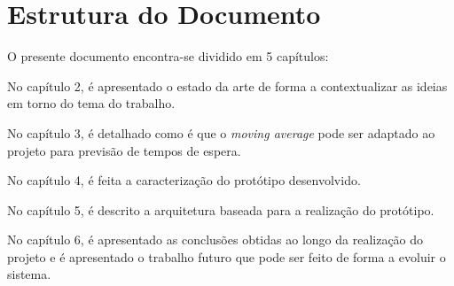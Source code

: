 \section{Estrutura do Documento} 
\label{sec:introduction}
O presente documento encontra-se dividido em 5 capítulos:

No capítulo 2, é apresentado o estado da arte de forma a contextualizar as ideias em torno do tema do trabalho.

No capítulo 3, é detalhado como é que o \textit{moving average} pode ser adaptado ao projeto para previsão de tempos de espera.

No capítulo 4, é feita a caracterização do protótipo desenvolvido.

No capítulo 5, é descrito a arquitetura baseada para a realização do protótipo.

No capítulo 6, é apresentado as conclusões obtidas ao longo da realização do projeto e é apresentado o trabalho futuro que pode ser feito de forma a evoluir o sistema.
